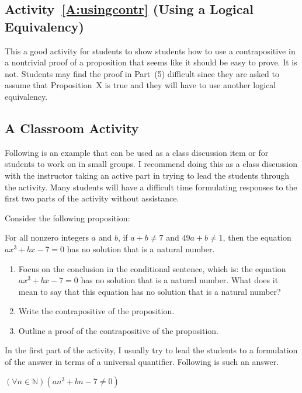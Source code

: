 \subsection*{Activity~\ref{A:usingcontr} (Using a Logical Equivalency)}  
This a good activity for students to show students how to use a contrapositive in a nontrivial proof of a proposition that seems like it should be easy to prove.  It is not.  Students may find the proof in Part~(5) difficult since they are asked to assume that Proposition~X is true and they will have to use another logical equivalency. 
\hbreak

\subsection*{A Classroom Activity}
Following is an example that can be used as a class discussion item or for students to work on in small groups.  I recommend doing this as a class discussion with the instructor taking an active part in trying to lead the students through the activity.  Many students will have a difficult time formulating responses to the first two parts of the activity without assistance.

\vskip6pt
\noindent
Consider the following proposition:

\noindent
For all nonzero integers $a$ and $b$, if $a + b \ne 7$ and $49a + b \ne 1$, then the equation 
$ax^3 + bx - 7 = 0$ has no solution that is a natural number.

\begin{enumerate}
\item Focus on the conclusion in the conditional sentence, which is: the equation 
$ax^3 + bx - 7 = 0$ has no solution that is a natural number.  What does it mean to say that this equation has no solution that is a natural number?

\item Write the contrapositive of the proposition.

\item Outline a proof of the contrapositive of the proposition.
\end{enumerate}

In the first part of the activity, I usually try to lead the students to a formulation of the answer in terms of a universal quantifier.  Following is such an answer.

\vskip6pt
\begin{center}
$\left( \forall n \in \mathbb{N} \right) \left( an^3 + bn - 7 \ne 0 \right)$
\end{center}


